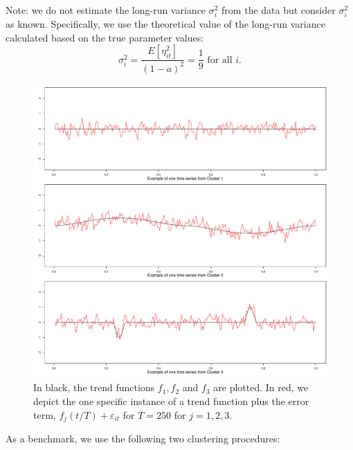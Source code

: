 \documentclass[a4paper,12pt]{article}
\begin{document}
\begin{enumerate}[label=\arabic*.,leftmargin=0.6cm]
{\color{red}Note: we do not estimate the long-run variance $\sigma_i^2$ from the data but consider $\sigma_i^2$ as known. Specifically, we use the theoretical value of the long-run variance calculated based on the true parameter values: $$\sigma_i^2 = \frac{E[\eta_{it}^2]}{(1 - a)^2} = \frac{1}{9} \text{ for all }i.$$}
\begin{figure}[t!]
\includegraphics[width=\textwidth]{output/clustering_functions.pdf}
\caption{In black, the trend functions $f_1, f_2$ and $f_3$ are plotted. In red, we depict the one specific instance of a trend function plus the error term, $f_j(t/T) + \varepsilon_{it}$ for $T=250$ for $j=1,2, 3$.}\label{fig:clustering_fcts}
\end{figure}
{\color{blue} As a benchmark, we use the following two clustering procedures:
}
\end{enumerate}
\end{document}
